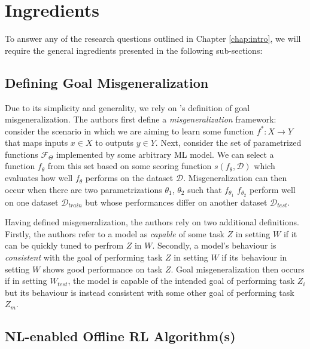 \documentclass[../thesis-proposal/main.tex]{subfiles}
\begin{document}
\section{Ingredients}

To answer any of the research questions outlined in Chapter \ref{chap:intro}, we will require the
general ingredients presented in the following sub-sections:

\subsection{Defining Goal Misgeneralization}

Due to its simplicity and generality, we rely on \citet{shah_goal_2022}'s definition of goal
misgeneralization. The authors first define a \textit{misgeneralization} framework: consider the
scenario in which we are aiming to learn some function $f^* : X \rightarrow Y$ that maps inputs $x
	\in X$ to outputs $y \in Y$. Next, consider the set of parametrized functions $\mathcal{F}_\Theta$
implemented by some arbitrary ML model. We can select a function $f_\theta$ from this set based on
some scoring function $s(f_\theta, \mathcal{D})$ which evaluates how well $f_\theta$ performs on the
dataset $\mathcal{D}$. Misgeneralization can then occur when there are two parametrizations
$\theta_1$, $\theta_2$  such that $f_{\theta_1}$ $f_{\theta_2}$ perform well on one dataset
$\mathcal{D}_{train}$ but whose performances differ on another dataset $\mathcal{D}_{test}$.

Having defined misgeneralization, the authors rely on two additional definitions. Firstly, the
authors refer to a model as \textit{capable} of some task $Z$ in setting $W$ if it can be quickly
tuned to perfrom $Z$ in $W$. Secondly, a model's behaviour is \textit{consistent} with the goal of
performing task $Z$ in setting $W$ if its behaviour in setting $W$ shows good performance on task
$Z$. Goal misgeneralization then occurs if in setting $W_{test}$, the model is capable of the
intended goal of performing task $Z_{i}$ but its behaviour is instead consistent with some other
goal of performing task $Z_{m}$.

\subsection{NL-enabled Offline RL Algorithm(s)}
\end{document}

